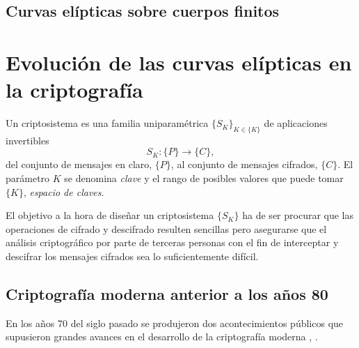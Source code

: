 \documentclass[
  a4paper,
  12pt,
  spanish,
]{scrartcl}
\begin{document}
\subsection{Curvas elípticas sobre cuerpos finitos}



\section{Evolución de las curvas elípticas en la criptografía}

Un criptosistema es una familia uniparamétrica \(\{S_K\}_{K \in \{K\}}\) de aplicaciones invertibles \[S_K: \{P\} \to \{C\},\] del conjunto de mensajes en claro, \(\{P\}\), al conjunto de mensajes cifrados, \(\{C\}\). 
El parámetro \(K\) se denomina \textit{clave} y el rango de posibles valores que puede tomar \(\{K\}\), \textit{espacio de claves}.

El objetivo a la hora de diseñar un criptosistema \(\{S_K\}\) ha de ser procurar que las operaciones de cifrado y descifrado resulten sencillas pero asegurarse que el análisis criptográfico por parte de terceras personas con el fin de interceptar y descifrar los mensajes cifrados sea lo suficientemente difícil.

\subsection{Criptografía moderna anterior a los años 80}



En los años 70 del siglo pasado se produjeron dos acontecimientos públicos que supusieron grandes avances en el desarrollo de la criptografía moderna \parencite{singh_code_2003}, \parencite{thawte_history_2013}.
\end{document}
